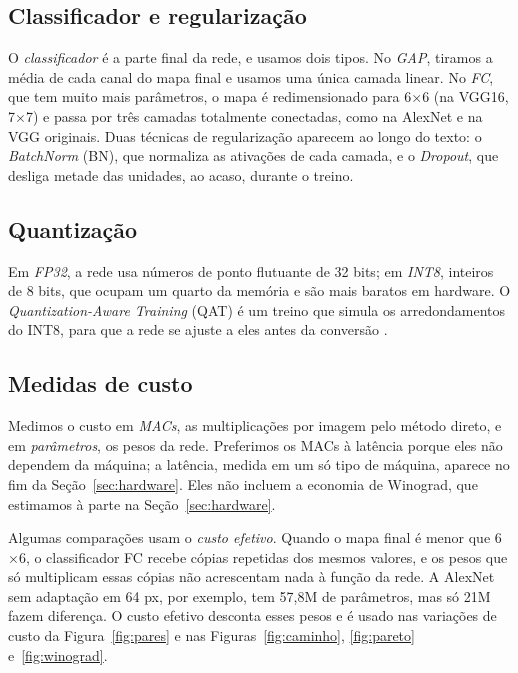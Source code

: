 \documentclass[conference]{IEEEtran}
\newcommand{\by}{\ensuremath{\times}}
\begin{document}
\subsection{Classificador e regularização}

O \textit{classificador} é a parte final da rede, e usamos dois tipos. No \textit{GAP}, tiramos a média de cada canal do mapa final e
usamos uma única camada linear. No \textit{FC}, que tem muito mais parâmetros, o mapa é redimensionado para 6\by6 (na VGG16, 7\by7) e
passa por três camadas totalmente conectadas, como na AlexNet e na VGG originais. Duas técnicas de regularização aparecem ao longo do
texto: o \textit{BatchNorm} (BN), que normaliza as ativações de cada camada, e o \textit{Dropout}, que desliga metade das unidades, ao
acaso, durante o treino.

\subsection{Quantização}

Em \textit{FP32}, a rede usa números de ponto flutuante de 32 bits; em \textit{INT8}, inteiros de 8 bits, que ocupam um quarto da
memória e são mais baratos em hardware. O \textit{Quantization-Aware Training} (QAT) é um treino que simula os arredondamentos do INT8,
para que a rede se ajuste a eles antes da conversão \cite{jacob2018quantization}.

\subsection{Medidas de custo}

Medimos o custo em \textit{MACs}, as multiplicações por imagem pelo método direto, e em \textit{parâmetros}, os pesos da rede.
Preferimos os MACs à latência porque eles não dependem da máquina; a latência, medida em um só tipo de máquina, aparece no fim da Seção~\ref{sec:hardware}. Eles não incluem a economia de Winograd, que estimamos à parte na
Seção~\ref{sec:hardware}.

Algumas comparações usam o \textit{custo efetivo}. Quando o mapa final é menor que 6\by6, o classificador FC recebe cópias repetidas
dos mesmos valores, e os pesos que só multiplicam essas cópias não acrescentam nada à função da rede. A AlexNet sem adaptação em 64 px,
por exemplo, tem 57,8M de parâmetros, mas só 21M fazem diferença. O custo efetivo desconta esses pesos e é usado nas variações de custo
da Figura~\ref{fig:pares} e nas Figuras~\ref{fig:caminho}, \ref{fig:pareto} e~\ref{fig:winograd}.
\end{document}
